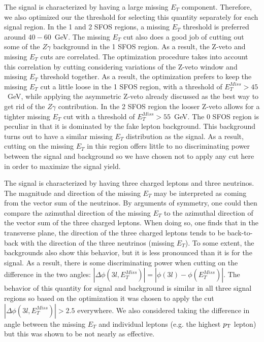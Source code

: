 The signal is characterized by having a large missing $E_{T}$ component.  Therefore, we also 
optimized our the threshold for selecting this quantity separately for each signal region. 
In the 1 and 2 SFOS regions, a missing $E_{T}$ threshold is preferred around $40-60$~GeV.
The missing $E_{T}$ cut also does a good job of cutting out some of the $Z\gamma$ background in the 1 
SFOS region.  As a result, the Z-veto and missing $E_{T}$ cuts are correlated.  The optimization
procedure takes into account this correlation by cutting considering variations of the Z-veto window
and missing $E_{T}$ threshold together.  As a result, the optimization prefers to keep the missing $E_{T}$ 
cut a little loose in the 1 SFOS region, with a threshold of $E_{T}^{Miss} > 45$~GeV,
while applying the asymmetric Z-veto already discussed as the best 
way to get rid of the $Z\gamma$ contribution.  In the 2 SFOS region the looser Z-veto allows for a tighter
missing $E_{T}$ cut with a threshold of $E_{T}^{Miss} > 55$~GeV. The 0 SFOS region is peculiar in that it is 
dominated by the fake lepton background.  This background turns out to have a similar missing $E_{T}$ distribution
as the signal. As a result, cutting on the missing $E_{T}$ in this region offers little to no discriminating power
between the signal and background so we have chosen not to apply any cut here in order to maximize the signal yield.


The signal is characterized by having three charged leptons and three neutrinos.  The magnitude and direction
of the missing $E_{T}$ may be interpreted as coming from the vector sum of the neutrinos.  By arguments of 
symmetry, one could then compare the azimuthal direction of the missing $E_{T}$ to the azimuthal direction of the vector
sum of the three charged leptons. When doing so, one finds that in the transverse plane, 
the direction of the three charged leptons
tends to be back-to-back with the direction of the three neutrinos (missing $E_{T}$). To some extent, the
backgrounds also show this behavior, but it is less pronounced than it is for the signal.  As a result, 
there is some discriminating power when cutting on the difference in the two angles: 
$|\Delta\phi(3l,E_{T}^{Miss})| = |\phi(3l)-\phi(E_{T}^{Miss})|$. The behavior of this quantity for signal and
background is similar in all three signal regions so based on the optimization it was chosen to apply the cut
$|\Delta\phi(3l,E_{T}^{Miss})| > 2.5$ everywhere.  We also considered taking the difference in angle between
the missing $E_{T}$ and individual leptons (e.g. the highest $p_{\mathrm{T}}$ lepton) but this was shown to be not 
nearly as effective.  


